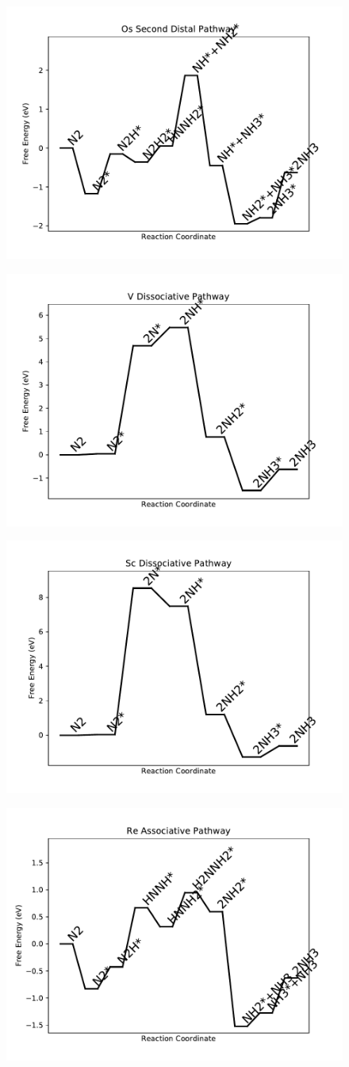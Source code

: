 \documentclass[journal=jacsat,manuscript=article]{achemso}
\begin{document}
\begin{figure}
\includegraphics[width=0.5\linewidth]{data/plots/Os_distal_2.pdf}
\label{fig:Os_distal_2}
\end{figure}

\newpage
\begin{figure}
\includegraphics[width=0.5\linewidth]{data/plots/V_dissociative.pdf}
\label{fig:V_dissociative}
\end{figure}

\begin{figure}
\includegraphics[width=0.5\linewidth]{data/plots/Sc_dissociative.pdf}
\label{fig:Sc_dissociative}
\end{figure}

\newpage
\begin{figure}
\includegraphics[width=0.5\linewidth]{data/plots/Re_associative.pdf}
\label{fig:Re_associative}
\end{figure}
\end{document}
